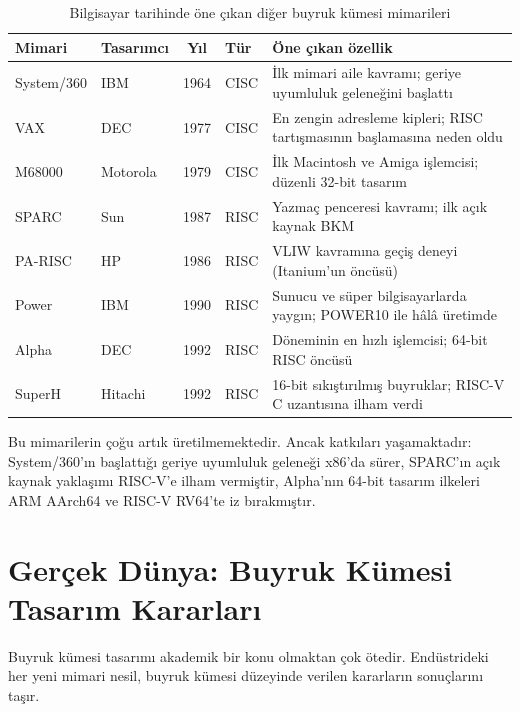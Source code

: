 \begin{table}[H]
\centering
\caption{Bilgisayar tarihinde öne çıkan diğer buyruk kümesi mimarileri}
\label{tab:diger-bkm-ozet}
\footnotesize
\begin{tabular}{llclp{5.8cm}}
\toprule
\textbf{Mimari} & \textbf{Tasarımcı} & \textbf{Yıl} & \textbf{Tür} & \textbf{Öne çıkan özellik} \\
\midrule
System/360\index{System/360} & IBM & 1964 & CISC & İlk mimari aile kavramı; geriye uyumluluk geleneğini başlattı \\[2pt]
VAX\index{VAX} & DEC & 1977 & CISC & En zengin adresleme kipleri; RISC tartışmasının başlamasına neden oldu \\[2pt]
M68000\index{Motorola 68000} & Motorola & 1979 & CISC & İlk Macintosh ve Amiga işlemcisi; düzenli 32-bit tasarım \\[2pt]
SPARC\index{SPARC} & Sun & 1987 & RISC & Yazmaç penceresi kavramı; ilk açık kaynak BKM \\[2pt]
PA-RISC\index{PA-RISC} & HP & 1986 & RISC & VLIW kavramına geçiş deneyi (Itanium'un öncüsü) \\[2pt]
Power\index{Power Architecture} & IBM & 1990 & RISC & Sunucu ve süper bilgisayarlarda yaygın; POWER10 ile hâlâ üretimde \\[2pt]
Alpha\index{DEC Alpha} & DEC & 1992 & RISC & Döneminin en hızlı işlemcisi; 64-bit RISC öncüsü \\[2pt]
SuperH\index{SuperH} & Hitachi & 1992 & RISC & 16-bit sıkıştırılmış buyruklar; RISC-V C uzantısına ilham verdi \\
\bottomrule
\end{tabular}
\end{table}

Bu mimarilerin çoğu artık üretilmemektedir. Ancak katkıları yaşamaktadır: System/360'ın başlattığı geriye uyumluluk geleneği x86'da sürer, SPARC'ın açık kaynak yaklaşımı RISC-V'e ilham vermiştir, Alpha'nın 64-bit tasarım ilkeleri ARM AArch64 ve RISC-V RV64'te iz bırakmıştır.


\section{Gerçek Dünya: Buyruk Kümesi Tasarım Kararları}
\label{sec:buyruk-gercek-dunya}

Buyruk kümesi tasarımı akademik bir konu olmaktan çok ötedir. Endüstrideki her yeni mimari nesil, buyruk kümesi düzeyinde verilen kararların sonuçlarını taşır.

